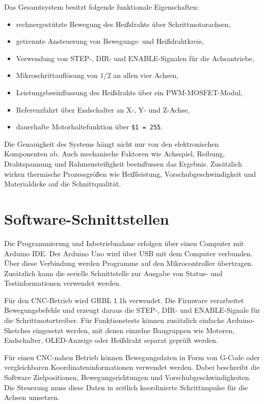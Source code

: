 Das Gesamtsystem besitzt folgende funktionale Eigenschaften:

\begin{itemize}
	\item rechnergestützte Bewegung des Heißdrahts über Schrittmotorachsen,
	\item getrennte Ansteuerung von Bewegungs- und Heißdrahtkreis,
	\item Verwendung von STEP-, DIR- und ENABLE-Signalen für die Achsantriebe,
	\item Mikroschrittauflösung von \(1/2\) an allen vier Achsen,
	\item Leistungsbeeinflussung des Heißdrahts über ein PWM-MOSFET-Modul,
	\item Referenzfahrt über Endschalter an X-, Y- und Z-Achse,
	\item dauerhafte Motorhaltefunktion über \texttt{\$1 = 255}.
\end{itemize}

Die Genauigkeit des Systems hängt nicht nur von den elektronischen Komponenten ab. Auch mechanische Faktoren wie Achsspiel, Reibung, Drahtspannung und Rahmensteifigkeit beeinflussen das Ergebnis. Zusätzlich wirken thermische Prozessgrößen wie Heißleistung, Vorschubgeschwindigkeit und Materialdicke auf die Schnittqualität.

\section{Software-Schnittstellen}
\label{sec:komplettes_system_software_schnittstellen}

Die Programmierung und Inbetriebnahme erfolgen über einen Computer mit Arduino IDE. Der Arduino Uno wird über USB mit dem Computer verbunden. Über diese Verbindung werden Programme auf den Mikrocontroller übertragen. Zusätzlich kann die serielle Schnittstelle zur Ausgabe von Status- und Testinformationen verwendet werden.

Für den CNC-Betrieb wird GRBL 1.1h verwendet. Die Firmware verarbeitet Bewegungsbefehle und erzeugt daraus die STEP-, DIR- und ENABLE-Signale für die Schrittmotortreiber. Für Funktionstests können zusätzlich einfache Arduino-Sketches eingesetzt werden, mit denen einzelne Baugruppen wie Motoren, Endschalter, OLED-Anzeige oder Heißdraht separat geprüft werden.

Für einen CNC-nahen Betrieb können Bewegungsdaten in Form von G-Code oder vergleichbaren Koordinateninformationen verwendet werden. Dabei beschreibt die Software Zielpositionen, Bewegungsrichtungen und Vorschubgeschwindigkeiten. Die Steuerung muss diese Daten in zeitlich koordinierte Schrittimpulse für die Achsen umsetzen.

